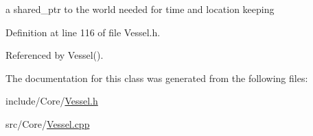 a shared\+\_\+ptr to the world needed for time and location keeping 



Definition at line 116 of file Vessel.\+h.



Referenced by Vessel().



The documentation for this class was generated from the following files\+:\begin{DoxyCompactItemize}
\item 
include/\+Core/\hyperlink{_vessel_8h}{Vessel.\+h}\item 
src/\+Core/\hyperlink{_vessel_8cpp}{Vessel.\+cpp}\end{DoxyCompactItemize}
